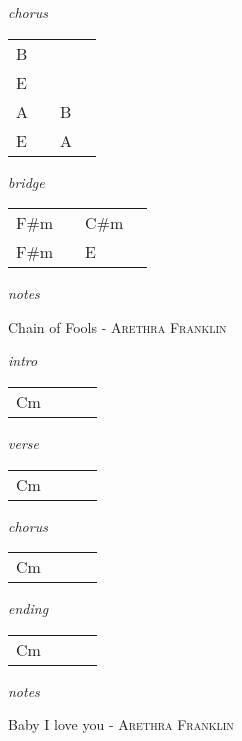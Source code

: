 \documentclass[12pt]{article}
\begin{document}
\textit{chorus}

\begin{tabular}{|P{1.25in}|P{1.25in}|P{1.25in}|P{1.25in}|}
  B &   &   &   \\
  E &   &   &   \\
\hline
  A &   &  B &  \\
  E &   &  A &   \\
\end{tabular}

\textit{bridge}

\begin{tabular}{|P{1.25in}|P{1.25in}|P{1.25in}|P{1.25in}|}
  F\#m &   & C\#m  &   \\
  F\#m &   &  E    & \\
\end{tabular}

\textit{notes}
  

\newpage

{\Huge Chain of Fools} {\huge - \textsc{Arethra Franklin}}

\huge
\textit{intro}

\begin{tabular}{|P{1.25in}|P{1.25in}|P{1.25in}|P{1.25in}|}
  Cm &   &   &   \\
\end{tabular}

\textit{verse}

\begin{tabular}{|P{1.25in}|P{1.25in}|P{1.25in}|P{1.25in}|}
  Cm &   &   &   \\
\end{tabular}

\textit{chorus}

\begin{tabular}{|P{1.25in}|P{1.25in}|P{1.25in}|P{1.25in}|}
  Cm &   &   &   \\
\end{tabular}

\textit{ending}

\begin{tabular}{|P{1.25in}|P{1.25in}|P{1.25in}|P{1.25in}|}
  Cm &   &   &   \\
\end{tabular}

\textit{notes}

\newpage

{\Huge Baby I love you} {\huge - \textsc{Arethra Franklin}}
\end{document}
